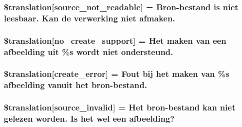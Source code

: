 \subsubsection[{\$translation}]{\setlength{\rightskip}{0pt plus 5cm}\$translation\mbox{[}\textquotesingle{}source\+\_\+not\+\_\+readable\textquotesingle{}\mbox{]} = \textquotesingle{}Bron-\/bestand is niet leesbaar. Kan de verwerking niet afmaken.\textquotesingle{}}\label{class_8upload_8nl___n_l_8php_a922967ca2df0efdd455261142d8e5715}
\hypertarget{class_8upload_8nl___n_l_8php_a346dfd1ade29f583dd20d345c436859f}{}
\subsubsection[{\$translation}]{\setlength{\rightskip}{0pt plus 5cm}\$translation\mbox{[}\textquotesingle{}no\+\_\+create\+\_\+support\textquotesingle{}\mbox{]} = \textquotesingle{}Het maken van een afbeelding uit \%s wordt niet ondersteund.\textquotesingle{}}\label{class_8upload_8nl___n_l_8php_a346dfd1ade29f583dd20d345c436859f}
\hypertarget{class_8upload_8nl___n_l_8php_a53013ce9255c4e1849098ddd9fdb2b3f}{}
\subsubsection[{\$translation}]{\setlength{\rightskip}{0pt plus 5cm}\$translation\mbox{[}\textquotesingle{}create\+\_\+error\textquotesingle{}\mbox{]} = \textquotesingle{}Fout bij het maken van \%s afbeelding vanuit het bron-\/bestand.\textquotesingle{}}\label{class_8upload_8nl___n_l_8php_a53013ce9255c4e1849098ddd9fdb2b3f}
\hypertarget{class_8upload_8nl___n_l_8php_a6ab0a660b457eaf2d3434b225449fdd6}{}
\subsubsection[{\$translation}]{\setlength{\rightskip}{0pt plus 5cm}\$translation\mbox{[}\textquotesingle{}source\+\_\+invalid\textquotesingle{}\mbox{]} = \textquotesingle{}Het bron-\/bestand kan niet gelezen worden. Is het wel een afbeelding?\textquotesingle{}}\label{class_8upload_8nl___n_l_8php_a6ab0a660b457eaf2d3434b225449fdd6}
\hypertarget{class_8upload_8nl___n_l_8php_a7f3dfcc0db4bbc0f2e7210c439798e56}{}
